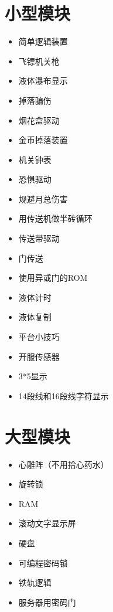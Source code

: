 \section{小型模块}
\begin{itemize}
\item 简单逻辑装置 
\item 飞镖机关枪 
\item 液体瀑布显示 
\item 掉落骗伤  
\item 烟花盒驱动 
\item 金币掉落装置 
\item 机关钟表 
\item 恐惧驱动 
\item 规避月总伤害 
\item 用传送机做半砖循环 
\item 传送带驱动 
\item 门传送 
\item 使用异或门的ROM 
\item 液体计时 
\item 液体复制 
\item 平台小技巧 
\item 开服传感器 
\item 3*5显示 
\item 14段线和16段线字符显示 
\end{itemize}

\section{大型模块}
\begin{itemize}
\item 心雕阵（不用拾心药水）
\item 旋转锁 
\item RAM 
\item 滚动文字显示屏 
\item 硬盘 
\item 可编程密码锁 
\item 铁轨逻辑 
\item 服务器用密码门 
\end{itemize}

